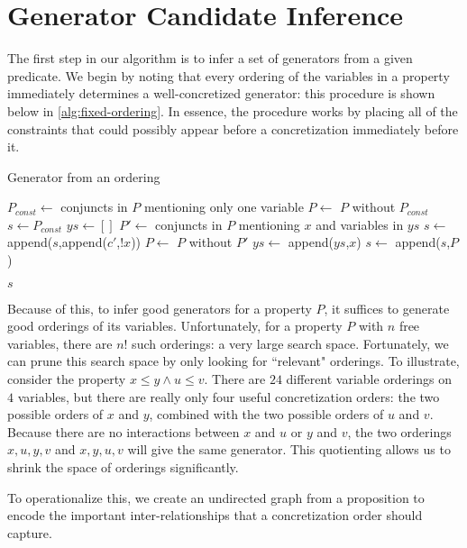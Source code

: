 \documentclass[sigconf,nonacm]{acmart}
\begin{document}
\section{Generator Candidate Inference}
\label{sec:sci}
The first step in our algorithm is to infer a set of generators from a given predicate. We begin by noting that every ordering of the variables in a property immediately determines a well-concretized generator: this procedure is shown below in \autoref{alg:fixed-ordering}. In essence, the procedure works by placing all of the constraints that could possibly appear before a concretization immediately before it.

\begin{algorithm}
    \caption{Generator from an ordering}
    \label{alg:fixed-ordering}
    \begin{algorithmic}
       \State $P_{const} \gets$ conjuncts in $P$ mentioning only one variable
       \State $P \gets$ $P$ without $P_{const}$
       \State $s \gets P_{const}$ 
       \State $ys \gets []$ 
         \State $P' \gets$ conjuncts in $P$ mentioning $x$ and variables in $ys$
         \State $s \gets$ append($s$,append($c'$,$!x$))
         \State $P \gets$ $P$ without $P'$
         \State $ys \gets$ append($ys$,$x$)
       \EndFor
       \State $s \gets$ append($s$,$P$)
       
       \Return $s$
      \EndFunction
    \end{algorithmic}
\end{algorithm}


Because of this, to infer good generators for a property $P$, it suffices to generate good orderings of its variables. Unfortunately, for a property $P$ with $n$ free variables, there are $n!$ such orderings: a very large search space. Fortunately, we can prune this search space by only looking for ``relevant" orderings. To illustrate, consider the property $x \leq y \wedge u \leq v$. There are $24$ different variable orderings on $4$ variables, but there are really only four useful concretization orders: the two possible orders of $x$ and $y$, combined with the two possible orders of $u$ and $v$. Because there are no interactions between $x$ and $u$ or $y$ and $v$, the two orderings $x,u,y,v$ and $x,y,u,v$ will give the same generator. This quotienting allows us to shrink the space of orderings significantly.

To operationalize this, we create an undirected graph from a proposition to encode the important inter-relationships that a concretization order should capture.
\end{document}
